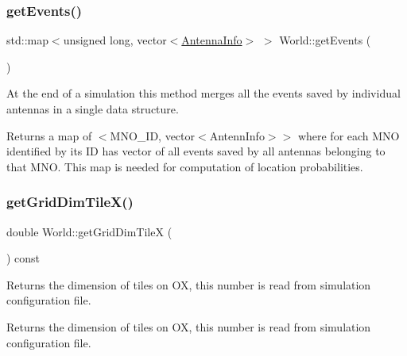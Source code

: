 \mbox{\label{class_world_a65eab81f8a895b605cbc90d887d0671a}} 
\subsubsection{\texorpdfstring{get\+Events()}{getEvents()}}
{\footnotesize\ttfamily std\+::map$<$unsigned long, vector$<$\hyperlink{class_antenna_info}{Antenna\+Info}$>$ $>$ World\+::get\+Events (\begin{DoxyParamCaption}{ }\end{DoxyParamCaption})}

At the end of a simulation this method merges all the events saved by individual antennas in a single data structure. \begin{DoxyReturn}{Returns}
a map of $<$M\+N\+O\+\_\+\+ID, vector$<$\+Antenn\+Info$>$$>$ where for each M\+NO identified by its ID has vector of all events saved by all antennas belonging to that M\+NO. This map is needed for computation of location probabilities. 
\end{DoxyReturn}
\mbox{\label{class_world_aa62f6cd42214191e37b904a672306888}} 
\subsubsection{\texorpdfstring{get\+Grid\+Dim\+Tile\+X()}{getGridDimTileX()}}
{\footnotesize\ttfamily double World\+::get\+Grid\+Dim\+TileX (\begin{DoxyParamCaption}{ }\end{DoxyParamCaption}) const\hspace{0.3cm}{\ttfamily [private]}}

Returns the dimension of tiles on OX, this number is read from simulation configuration file. \begin{DoxyReturn}{Returns}
the dimension of tiles on OX, this number is read from simulation configuration file. 
\end{DoxyReturn}
\mbox{\label{class_world_a99a004c6f3ce1a3a76894bb1f9625bbe}} 
